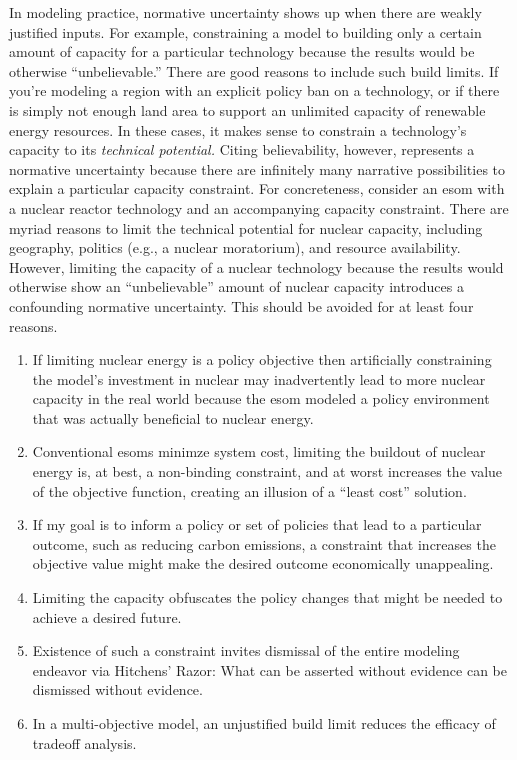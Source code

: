 In modeling practice, normative uncertainty shows up when there are weakly
justified inputs. For example, constraining a model to building only a certain
amount of capacity for a particular technology because the results would be
otherwise ``unbelievable.'' There are good reasons to include such build limits.
If you're modeling a region with an explicit policy ban on a technology, or if
there is simply not enough land area to support an unlimited capacity of
renewable energy resources. In these cases, it makes sense to constrain a
technology's capacity to its \textit{technical potential.} Citing believability,
however, represents a normative uncertainty because there are infinitely many
narrative possibilities to explain a particular capacity constraint. For
concreteness, consider an \ac{esom} with a nuclear reactor technology and an
accompanying capacity constraint. There are myriad reasons to limit the
technical potential for nuclear capacity, including geography, politics (e.g., a
nuclear moratorium), and resource availability. However, limiting the capacity
of a nuclear technology because the results would otherwise show an
``unbelievable'' amount of nuclear capacity introduces a confounding normative
uncertainty. This should be avoided for at least four reasons.
\begin{enumerate}
    \item If limiting nuclear energy is a policy objective then artificially
    constraining the model's investment in nuclear may inadvertently lead to
    more nuclear capacity in the real world because the \ac{esom} modeled a
    policy environment that was actually beneficial to nuclear energy.
    \item Conventional \acp{esom} minimze system cost, limiting the buildout of
    nuclear energy is, at best, a non-binding constraint, and at worst increases
    the value of the objective function, creating an illusion of a ``least
    cost'' solution.
    \item If my goal is to inform a policy or set of policies that lead to a
    particular outcome, such as reducing carbon emissions, a constraint that
    increases the objective value might make the desired outcome economically
    unappealing. 
    \item Limiting the capacity obfuscates the policy changes that might be
    needed to achieve a desired future.
    \item Existence of such a constraint invites dismissal of the entire
    modeling endeavor via Hitchens' Razor: What can be asserted without evidence
    can be dismissed without evidence.
    \item In a multi-objective model, an unjustified build limit reduces the
    efficacy of tradeoff analysis.
\end{enumerate}

